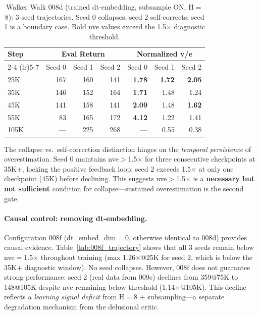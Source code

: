 \documentclass[letterpaper]{article}
\begin{document}
\begin{table}[t]
\centering
\caption{Walker Walk 008d (trained dt-embedding, subsample ON, H$=$8): 3-seed trajectories. Seed 0 collapses; seed 2 self-corrects; seed 1 is a boundary case. Bold nve values exceed the 1.5$\times$ diagnostic threshold.}
\label{tab:008d_trajectory}
\small
\begin{tabular}{lrrrrrr}
\toprule
Step & \multicolumn{3}{c}{Eval Return} & \multicolumn{3}{c}{Normalized v/e} \\
\cmidrule(lr){2-4} \cmidrule(lr){5-7}
& Seed 0 & Seed 1 & Seed 2 & Seed 0 & Seed 1 & Seed 2 \\
\midrule
25K & 167 & 160 & 141 & \textbf{1.78} & \textbf{1.72} & \textbf{2.05} \\
35K & 146 & 152 & 164 & \textbf{1.71} & 1.48 & 1.24 \\
45K & 141 & 158 & 141 & \textbf{2.09} & 1.48 & \textbf{1.62} \\
55K & 83 & 165 & 172 & \textbf{4.12} & 1.22 & 1.41 \\
105K & --- & 225 & 268 & --- & 0.55 & 0.38 \\
\bottomrule
\end{tabular}
\end{table}

The collapse vs.\ self-correction distinction hinges on the \emph{temporal persistence} of overestimation.
Seed 0 maintains nve$>$1.5$\times$ for three consecutive checkpoints at 35K+, locking the positive feedback loop; seed 2 exceeds 1.5$\times$ at only one checkpoint (45K) before declining.
This suggests nve$>$1.5$\times$ is a \textbf{necessary but not sufficient} condition for collapse---sustained overestimation is the second gate.

\paragraph{Causal control: removing dt-embedding.}
Configuration 008f (dt\_embed\_dim$=$0, otherwise identical to 008d) provides causal evidence.
Table~\ref{tab:008f_trajectory} shows that all 3 seeds remain below nve$=$1.5$\times$ throughout training (max 1.26$\times$@25K for seed 2, which is below the 35K+ diagnostic window).
No seed collapses.
However, 008f does not guarantee strong performance: seed 2 (real data from 009c) declines from 359@75K to 148@105K despite nve remaining below threshold (1.14$\times$@105K).
This decline reflects a \emph{learning signal deficit} from H$=$8 + subsampling---a separate degradation mechanism from the delusional critic.
\end{document}
